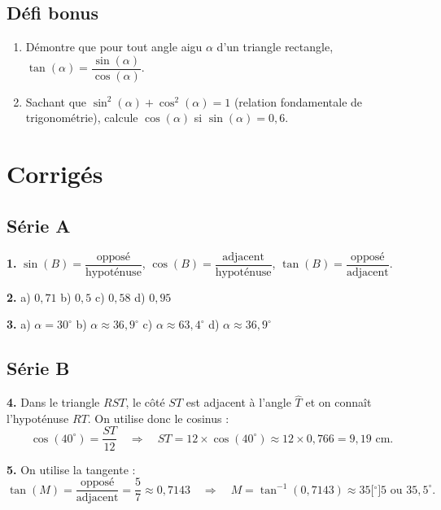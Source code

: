\documentclass[11pt,a4paper]{article}
\newcommand{\dec}{{,}} %
\begin{document}
\subsection{Défi bonus}

\begin{enumerate}[label=\alph*)]
  \item Démontre que pour tout angle aigu $\alpha$ d'un triangle rectangle, $\tan(\alpha) = \dfrac{\sin(\alpha)}{\cos(\alpha)}$.
  \item Sachant que $\sin^2(\alpha) + \cos^2(\alpha) = 1$ (relation fondamentale de trigonométrie), calcule $\cos(\alpha)$ si $\sin(\alpha) = 0\dec 6$.
\end{enumerate}

\newpage
\section{Corrigés}

\subsection*{Série A}

\textbf{1.} $\sin(B) = \dfrac{\text{opposé}}{\text{hypoténuse}}$, $\cos(B) = \dfrac{\text{adjacent}}{\text{hypoténuse}}$, $\tan(B) = \dfrac{\text{opposé}}{\text{adjacent}}$.

\textbf{2.} a) $0\dec 71$ \quad b) $0\dec 5$ \quad c) $0\dec 58$ \quad d) $0\dec 95$

\textbf{3.} a) $\alpha = 30^\circ$ \quad b) $\alpha \approx 36\dec 9^\circ$ \quad c) $\alpha \approx 63\dec 4^\circ$ \quad d) $\alpha \approx 36\dec 9^\circ$

\subsection*{Série B}

\textbf{4.} Dans le triangle $RST$, le côté $ST$ est adjacent à l'angle $\widehat{T}$ et on connaît l'hypoténuse $RT$. On utilise donc le cosinus :
\[
\cos(40^\circ) = \frac{ST}{12} \quad\Longrightarrow\quad ST = 12 \times \cos(40^\circ) \approx 12 \times 0\dec 766 = 9\dec 19\text{ cm}.
\]

\textbf{5.} On utilise la tangente :
\[
\tan(M) = \frac{\text{opposé}}{\text{adjacent}} = \frac{5}{7} \approx 0\dec 7143 \quad\Longrightarrow\quad M = \tan^{-1}(0\dec 7143) \approx 35\big[{^\circ}\big]5 \text{ ou } 35\dec 5^\circ.
\]
\end{document}
